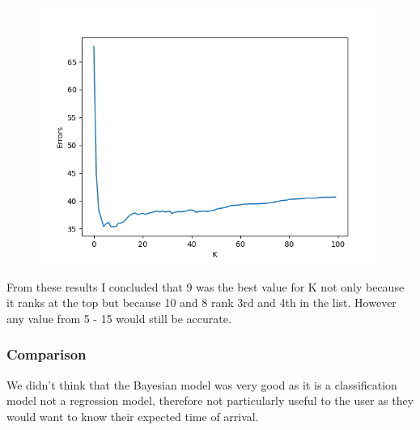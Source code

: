 \documentclass[11pt]{article}
\begin{document}
	\begin{figure}[!htb]
		\centering
		\begin{minipage}{.8\textwidth}
			\centering
			\includegraphics[width=.8\linewidth]{Resources/PartTwo/searchingForK_20220110_065714.png}
			\label{Img:KSearch}
		\end{minipage}%
		\begin{minipage}{.2\textwidth}
			\centering
			\label{Img:KSearchRaw}
		\end{minipage}
	\end{figure}

	From these results I concluded that 9 was the best value for K not only because it ranks at the top but because 10 and 8 rank 3rd and 4th in the list. However any value from 5 - 15 would still be accurate.
	\subsubsection{Comparison}
	We didn't think that the Bayesian model was very good as it is a classification model not a regression model, therefore not particularly useful to the user as they would want to know their expected time of arrival.
	
	
\end{document}
